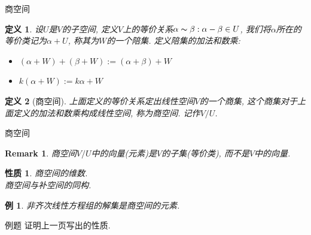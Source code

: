 \documentclass[11pt]{beamer}
\newtheorem{defi}{定义}[section]
\newtheorem{prop}{性质}[section]
\newtheorem{exmp}{例}[section]
\newtheorem{rmk}{Remark}[section]
\begin{document}
\begin{frame}{商空间}
	\begin{defi}
		设$U$是$V$的子空间, 定义$V$上的等价关系$\alpha\thicksim\beta: \alpha-\beta\in U$, 我们将$\alpha$所在的等价类记为$\alpha+U$, 称其为$W$的一个陪集. 定义陪集的加法和数乘:
		\begin{itemize}
			\item $(\alpha+W)+(\beta+W):=(\alpha+\beta)+W$
			\item $k(\alpha+W):=k\alpha+W$
		\end{itemize}
	\end{defi}
	\begin{defi}[商空间]
		上面定义的等价关系定出线性空间$V$的一个商集, 这个商集对于上面定义的加法和数乘构成线性空间, 称为商空间. 记作$V/U$.
	\end{defi}
\end{frame}

\begin{frame}{商空间}
\begin{rmk}
	商空间$V/U$中的向量(元素)是$V$的子集(等价类), 而不是$V$中的向量.
\end{rmk}
\begin{prop}
	商空间的维数.\\
	商空间与补空间的同构.
\end{prop}
\begin{exmp}
	非齐次线性方程组的解集是商空间的元素.
\end{exmp}
\end{frame}

\begin{frame}{例题}
	证明上一页写出的性质.
\end{frame}
\end{document}
